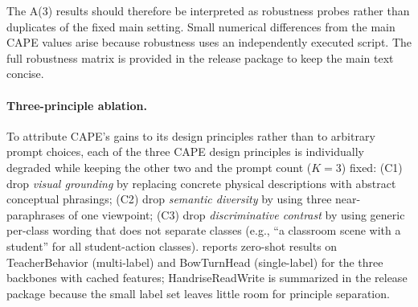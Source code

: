 \documentclass[electronics,article,submit,pdftex,moreauthors]{Definitions/mdpi}
\begin{document}
The A(3) results should therefore be interpreted as robustness probes rather than duplicates of the fixed main setting. Small numerical differences from the main CAPE values arise because robustness uses an independently executed script. The full robustness matrix is provided in the release package to keep the main text concise.

\paragraph{Three-principle ablation.}
To attribute CAPE's gains to its design principles rather than to arbitrary prompt choices, each of the three CAPE design principles is individually degraded while keeping the other two and the prompt count ($K=3$) fixed: (\textsc{C1}) drop \emph{visual grounding} by replacing concrete physical descriptions with abstract conceptual phrasings; (\textsc{C2}) drop \emph{semantic diversity} by using three near-paraphrases of one viewpoint; (\textsc{C3}) drop \emph{discriminative contrast} by using generic per-class wording that does not separate classes (e.g., ``a classroom scene with a student'' for all student-action classes).  reports zero-shot results on TeacherBehavior (multi-label) and BowTurnHead (single-label) for the three backbones with cached features; HandriseReadWrite is summarized in the release package because the small label set leaves little room for principle separation.
\end{document}
